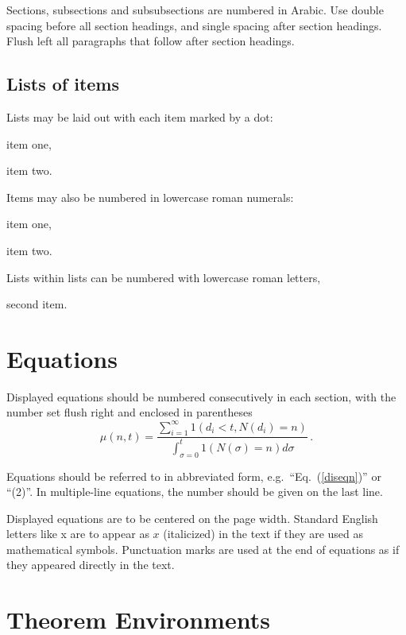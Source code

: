 \documentclass{ws-ijmpa}
\begin{document}
Sections, subsections and subsubsections are numbered in
Arabic.  Use double spacing before all section headings, and
single spacing after section headings. Flush left all paragraphs
that follow after section headings.

\subsection{Lists of items}

Lists may be laid out with each item marked by a dot:
\begin{itemlist}
 \item item one,
 \item item two.
\end{itemlist}
Items may also be numbered in lowercase roman numerals:
\begin{romanlist}[(ii)]
\item item one,
\item item two.
	\begin{romanlist}[(b)]
	\item Lists within lists can be numbered with lowercase
              roman letters,
	\item second item.
	\end{romanlist}
\end{romanlist}

\section{Equations}

Displayed equations should be numbered consecutively in each
section, with the number set flush right and enclosed in
parentheses
\begin{equation}
\mu(n, t) = \frac{\sum^\infty_{i=1} 1(d_i < t, N(d_i)
= n)}{\int^t_{\sigma=0} 1(N(\sigma) = n)d\sigma}\,.
\label{diseqn}
\end{equation}

Equations should be referred to in abbreviated form,
e.g.~``Eq.~(\ref{diseqn})'' or ``(2)''. In multiple-line
equations, the number should be given on the last line.

Displayed equations are to be centered on the page width.
Standard English letters like x are to appear as $x$
(italicized) in the text if they are used as mathematical
symbols. Punctuation marks are used at the end of equations as
if they appeared directly in the text.

\section{Theorem Environments}
\end{document}
